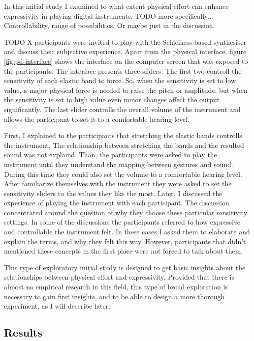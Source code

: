 \documentclass{sigchi}
\begin{document}
In this initial study I examined to what extent physical effort can enhance expressivity in playing digital instruments.
TODO more specifically... Controllability, range of possibilities. Or maybe just in the discussion.

TODO X participants were invited to play with the Schleikess based synthesiser and discuss their subjective experience.
Apart from the physical interface, figure \ref{fig:pd-interface} shows the interface on the computer screen that was exposed to the participants.
The interface presents three sliders.
The first two controll the sensitivity of each elastic band to force.
So, when the sensitivity is set to low value, a major physical force is needed to raise the pitch or amplitude, but when the sensitivity is set to high value even minor changes affect the output significantly.
The last slider controlls the overall volume of the instrument and allows the participant to set it to a comfortable hearing level.

First, I explained to the participants that stretching the elastic bands controlls the instrument.
The relationship between stretching the bands and the resulted sound was not explaind.
Than, the participants were asked to play the instrument until they understand the mapping between gestures and sound.
During this time they could also set the volume to a comfortable hearing level.
After familiarize themselves with the instrument they were asked to set the sensitivity sliders to the values they like the most.
Later, I discussed the experience of playing the instrument with each participant.
The discussion concentrated around the question of why they choose these particular sensitivity settings.
In some of the discussions the participants referred to how expressive and controllable the instrument felt.
In these cases I asked them to elaborate and explain the terms, and why they felt this way.
However, participants that didn't mentioned these concepts in the first place were not forced to talk about them.

This type of exploratory initial study is designed to get basic insights about the relationships between physical effort and expressivity.
Provided that there is almost no empirical research in this field, this type of broad exploration is necessary to gain first insights, and to be able to design a more thorough experiment, as I will describe later.

\subsection{Results}
\end{document}
